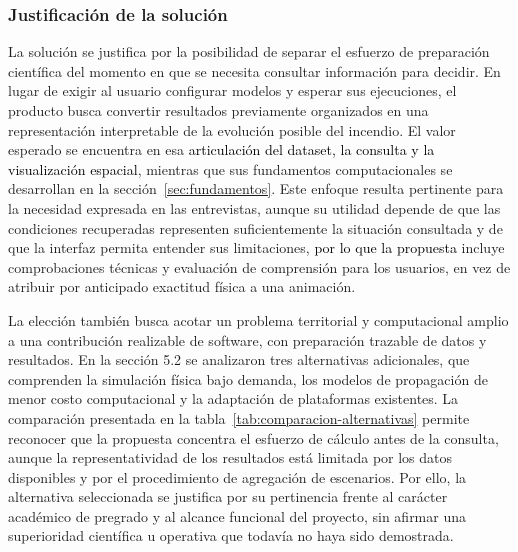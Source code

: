 
\subsubsection{Justificación de la solución}
La solución se justifica por la posibilidad de separar el esfuerzo de preparación científica del momento en que se necesita consultar información para decidir. En lugar de exigir al usuario configurar modelos y esperar sus ejecuciones, el producto busca convertir resultados previamente organizados en una representación interpretable de la evolución posible del incendio. El valor esperado se encuentra en esa \textcolor{black}{articulación del dataset, la consulta y la visualización espacial}, mientras que sus fundamentos computacionales se desarrollan en la sección~\ref{sec:fundamentos}. Este enfoque resulta pertinente para la necesidad expresada en las entrevistas, aunque su utilidad depende de que las condiciones recuperadas representen suficientemente la situación consultada y de que la interfaz permita entender sus limitaciones, \textcolor{black}{por lo que la propuesta} incluye comprobaciones técnicas y evaluación de comprensión para los usuarios, en vez de atribuir por anticipado exactitud física a una animación.


La elección también busca acotar un problema territorial y computacional amplio a una contribución realizable de software, con preparación trazable de datos y resultados. En la sección 5.2 se analizaron tres alternativas adicionales, que comprenden la simulación física bajo demanda, los modelos de propagación de menor costo computacional y la adaptación de plataformas existentes. La comparación presentada en la tabla~\ref{tab:comparacion-alternativas} permite reconocer que la propuesta concentra el esfuerzo de cálculo antes de la consulta, aunque la representatividad de los resultados está limitada por los datos disponibles y por el procedimiento de agregación de escenarios. Por ello, la alternativa seleccionada se justifica por su pertinencia frente al carácter académico de pregrado y al alcance funcional del proyecto, sin afirmar una superioridad científica u operativa que todavía no haya sido demostrada.
